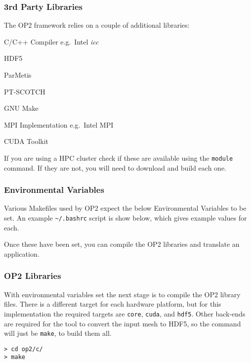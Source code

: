 \subsubsection{3rd Party Libraries}
The OP2 framework relies on a couple of additional libraries:
\begin{itemize}
\begin{multicols}{2}
\item{C/C++ Compiler e.g.\ Intel \textit{icc}}
\item{HDF5}
\item{ParMetis}
\item{PT-SCOTCH}
\item{GNU Make}
\item{MPI Implementation e.g.\ Intel MPI}
\item{CUDA Toolkit}
\end{multicols}
\end{itemize}

\noindent If you are using a HPC cluster check if these are available using the \verb|module| command. If they are not, you will need to download and build each one.

\subsubsection{Environmental Variables}
Various Makefiles used by OP2 expect the below Environmental Variables to be set. An example \verb|~/.bashrc| script is show below, which gives example values for each.



\noindent Once these have been set, you can compile the OP2 libraries and translate an application.
\clearpage
\subsubsection{OP2 Libraries}
With environmental variables set the next stage is to compile the OP2 library files. There is a different target for each hardware platform, but for this implementation the required targets are \verb|core|, \verb|cuda|, and \verb|hdf5|. Other back-ends are required for the tool to convert the input mesh to HDF5, so the command will just be \verb|make|, to build them all.
\begin{verbatim}
> cd op2/c/
> make
\end{verbatim}

